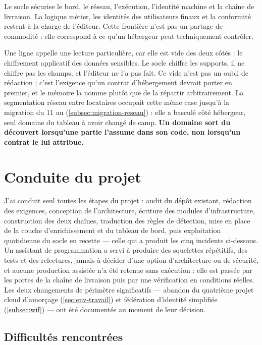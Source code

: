 \begin{keybox}[boxsep=1pt, left=4pt, right=4pt, top=3pt, bottom=3pt]
Le socle sécurise le bord, le réseau, l'exécution, l'identité machine et la chaîne de livraison.
La logique métier, les identités des utilisateurs finaux et la conformité restent à la charge de
l'éditeur. Cette frontière n'est pas un partage de commodité : elle correspond à ce qu'un
hébergeur peut techniquement contrôler.
\end{keybox}

Une ligne appelle une lecture particulière, car elle est vide des deux côtés : le chiffrement
applicatif des données sensibles. Le socle chiffre les supports, il ne chiffre pas les champs, et
l'éditeur ne l'a pas fait. Ce vide n'est pas un oubli de rédaction ; c'est l'exigence qu'un contrat
d'hébergement devrait porter en premier, et le mémoire la nomme plutôt que de la répartir
arbitrairement. La segmentation réseau entre locataires occupait cette même case jusqu'à la
migration du 11 au \dateref{} (\cref{subsec:migration-reseau}) : elle a basculé côté hébergeur, seul
domaine du tableau à avoir changé de camp. \textbf{Un domaine sort du découvert lorsqu'une partie
l'assume dans son code, non lorsqu'un contrat le lui attribue.}

\section{Conduite du projet}

J'ai conduit seul toutes les étapes du projet : audit du dépôt existant, rédaction des exigences,
conception de l'architecture, écriture des modules d'infrastructure, construction des deux chaînes,
traduction des règles de détection, mise en place de la couche d'enrichissement et du tableau de
bord, puis exploitation quotidienne du socle en recette --- celle qui a produit les cinq incidents
ci-dessous. Un assistant de programmation a servi à produire des squelettes répétitifs, des tests et
des relectures, jamais à décider d'une option d'architecture ou de sécurité, et aucune production
assistée n'a été retenue sans exécution : elle est passée par les portes de la chaîne de livraison
puis par une vérification en conditions réelles. Les deux changements de périmètre significatifs ---
abandon du quatrième projet cloud d'amorçage (\cref{sec:env-travail}) et fédération d'identité
simplifiée (\cref{subsec:wif}) --- ont été documentés au moment de leur décision.

\subsection{Difficultés rencontrées}
\label{subsec:incidents}

